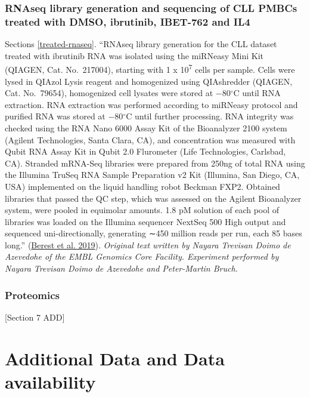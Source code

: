 \documentclass[11pt, a4paper, twosided]{book}
\begin{document}
\hypertarget{rnaseq-library-generation-and-sequencing-of-cll-pmbcs-treated-with-dmso-ibrutinib-ibet-762-and-il4}{%
\subsubsection{RNAseq library generation and sequencing of CLL PMBCs treated with DMSO, ibrutinib, IBET-762 and IL4}\label{rnaseq-library-generation-and-sequencing-of-cll-pmbcs-treated-with-dmso-ibrutinib-ibet-762-and-il4}}

Sections \ref{treated-rnaseq}. ``RNAseq library generation for the CLL dataset treated with ibrutinib
RNA was isolated using the miRNeasy Mini Kit (QIAGEN, Cat. No.~217004), starting with 1 x 10\textsuperscript{7} cells per sample. Cells were lysed in QIAzol Lysis reagent and homogenized using QIAshredder (QIAGEN, Cat. No.~79654), homogenized cell lysates were stored at −80\(^\circ\)C until RNA extraction. RNA extraction was performed according to miRNeasy protocol and purified RNA was stored at −80\(^\circ\)C until further processing. RNA integrity was checked using the RNA Nano 6000 Assay Kit of the Bioanalyzer 2100 system (Agilent Technologies, Santa Clara, CA), and concentration was measured with Qubit RNA Assay Kit in Qubit 2.0 Flurometer (Life Technologies, Carlsbad, CA). Stranded mRNA-Seq libraries were prepared from 250ng of total RNA using the Illumina TruSeq RNA Sample Preparation v2 Kit (Illumina, San Diego, CA, USA) implemented on the liquid handling robot Beckman FXP2. Obtained libraries that passed the QC step, which was assessed on the Agilent Bioanalyzer system, were pooled in equimolar amounts. 1.8 pM solution of each pool of libraries was loaded on the Illumina sequencer NextSeq 500 High output and sequenced uni-directionally, generating ∼450 million reads per run, each 85 bases long.'' (\protect\hyperlink{ref-Berest2019}{Berest et al. 2019}). \emph{Original text written by Nayara Trevisan Doimo de Azevedohe of the EMBL Genomics Core Facility. Experiment performed by Nayara Trevisan Doimo de Azevedohe and Peter-Martin Bruch.}

\hypertarget{proteomics}{%
\subsubsection{Proteomics}\label{proteomics}}

{[}Section 7 ADD{]}

\hypertarget{additional-data-and-data-availability}{%
\section{Additional Data and Data availability}\label{additional-data-and-data-availability}}
\end{document}
